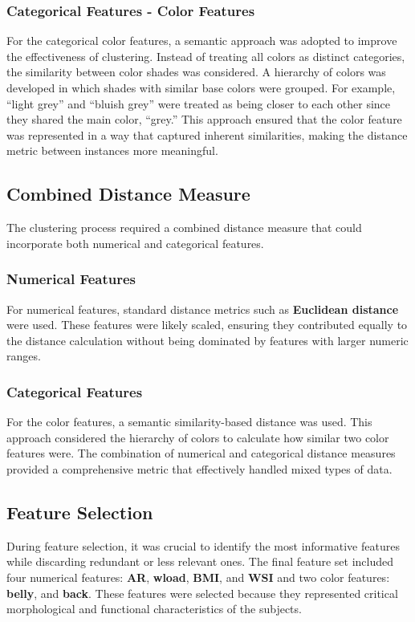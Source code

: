 \documentclass{article}
\begin{document}
\subsubsection{Categorical Features - Color Features}
For the categorical color features, a semantic approach was adopted to improve the effectiveness of clustering. Instead of treating all colors as distinct categories, the similarity between color shades was considered. A hierarchy of colors was developed in which shades with similar base colors were grouped. For example, ``light grey'' and ``bluish grey'' were treated as being closer to each other since they shared the main color, ``grey.'' This approach ensured that the color feature was represented in a way that captured inherent similarities, making the distance metric between instances more meaningful.



\subsection{Combined Distance Measure}
The clustering process required a combined distance measure that could incorporate both numerical and categorical features.

\subsubsection{Numerical Features}
For numerical features, standard distance metrics such as \textbf{Euclidean distance} were used. These features were likely scaled, ensuring they contributed equally to the distance calculation without being dominated by features with larger numeric ranges.

\subsubsection{Categorical Features}
For the color features, a semantic similarity-based distance was used. This approach considered the hierarchy of colors to calculate how similar two color features were. The combination of numerical and categorical distance measures provided a comprehensive metric that effectively handled mixed types of data.

\subsection{Feature Selection}
During feature selection, it was crucial to identify the most informative features while discarding redundant or less relevant ones. The final feature set included four numerical features: \textbf{AR}, \textbf{wload}, \textbf{BMI}, and \textbf{WSI} and two color features: \textbf{belly}, and \textbf{back}. These features were selected because they represented critical morphological and functional characteristics of the subjects.
\end{document}
